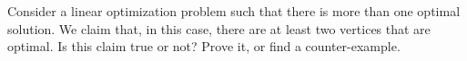 
Consider a linear optimization problem such that
there is more than one optimal solution. We claim that, in this case, there
  are at least two vertices that are optimal. Is this claim true or
  not? Prove it, or find a counter-example. 

